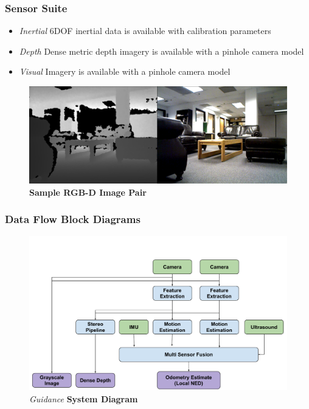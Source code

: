 \documentclass{beamer}
\begin{document}
\begin{frame}
\frametitle{Sensor Suite}
\vspace{1.6\baselineskip}
\begin{itemize}
\item{\textit{Inertial}} 6DOF inertial data is available with calibration parameters
\item{\textit{Depth}} Dense metric depth imagery is available with a pinhole camera model
\item{\textit{Visual}} Imagery is available with a pinhole camera model
\end{itemize}
\begin{figure}
\includegraphics[width=1.0\textwidth]{figures/xtion_rgb_depth}
\caption{\textbf{Sample RGB-D Image Pair}}
\end{figure}
\end{frame}


\begin{frame}
\frametitle{Data Flow Block Diagrams}
\begin{figure}
\vspace{-1cm}
\includegraphics[width=0.9\linewidth]{figures/GuidanceBlock}
\caption{\textit{Guidance} \textbf{ System Diagram}}
\end{figure}
\end{frame}
\end{document}
